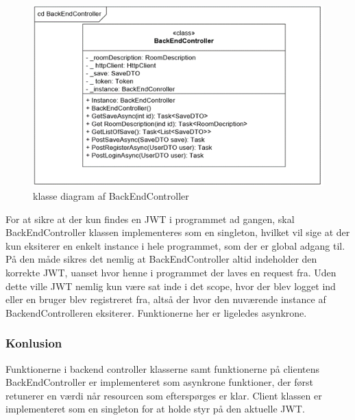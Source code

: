 \begin{figure}[H]
\centering
\includegraphics[width = \textwidth]{02-Body/Images/Backend_klasse_BackEndController.PNG}
\caption{klasse diagram af BackEndController}
\label{fig:Implementering-Backend-Klasse-BackEndController}
\end{figure}

For at sikre at der kun findes en JWT i programmet ad gangen, skal BackEndController klassen implementeres som en singleton, hvilket vil sige at der kun eksiterer en enkelt instance i hele programmet, som der er global adgang til. På den måde sikres det nemlig at BackEndController altid indeholder den korrekte JWT, uanset hvor henne i programmet der laves en request fra. Uden dette ville JWT nemlig kun være sat inde i det scope, hvor der blev logget ind eller en bruger blev registreret fra, altså der hvor den nuværende instance af BackendControlleren eksiterer. Funktionerne her er ligeledes asynkrone.\\


\subsubsection{Konlusion}

Funktionerne i backend controller klasserne samt funktionerne på clientens BackEndController er implementeret som asynkrone funktioner, der først retunerer en værdi når resourcen som efterspørges er klar. Client klassen er implementeret som en singleton for at holde styr på den aktuelle JWT.

\newpage
